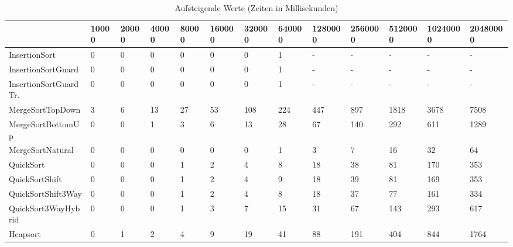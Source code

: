 \begin{table}[h]
\begin{tabular}{|l|l|l|l|l|l|l|l|l|l|l|l|l|}
\hline
 & 10000 & 20000 & 40000 & 80000 & 160000 & 320000 & 640000 & 1280000 & 2560000 & 5120000 & 10240000 & 20480000 \\ \hline
InsertionSort & 0 & 0 & 0 & 0 & 0 & 0 & 1 & - & - & - & - & - \\ \hline
InsertionSortGuard & 0 & 0 & 0 & 0 & 0 & 0 & 1 & - & - & - & - & - \\ \hline
InsertionSortGuardTr. & 0 & 0 & 0 & 0 & 0 & 0 & 1 & - & - & - & - & - \\ \hline
MergeSortTopDown & 3 & 6 & 13 & 27 & 53 & 108 & 224 & 447 & 897 & 1818 & 3678 & 7508 \\ \hline
MergeSortBottomUp & 0 & 0 & 1 & 3 & 6 & 13 & 28 & 67 & 140 & 292 & 611 & 1289 \\ \hline
MergeSortNatural & 0 & 0 & 0 & 0 & 0 & 0 & 1 & 3 & 7 & 16 & 32 & 64 \\ \hline
QuickSort & 0 & 0 & 0 & 1 & 2 & 4 & 8 & 18 & 38 & 81 & 170 & 353 \\ \hline
QuickSortShift & 0 & 0 & 0 & 1 & 2 & 4 & 9 & 18 & 39 & 81 & 169 & 353 \\ \hline
QuickSortShift3Way & 0 & 0 & 0 & 1 & 2 & 4 & 8 & 18 & 37 & 77 & 161 & 334 \\ \hline
QuickSort3WayHybrid & 0 & 0 & 0 & 1 & 3 & 7 & 15 & 31 & 67 & 143 & 293 & 617 \\ \hline
Heapsort & 0 & 1 & 2 & 4 & 9 & 19 & 41 & 88 & 191 & 404 & 844 & 1764 \\ \hline
\end{tabular}
\caption{Aufsteigende Werte (Zeiten in Millisekunden)}
\end{table}
